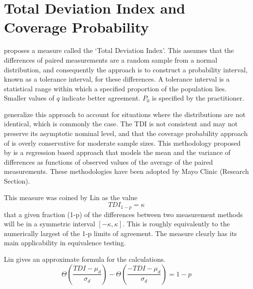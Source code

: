 \documentclass[12pt, a4paper]{report}
\theoremstyle{plain}
\theoremstyle{definition}
\theoremstyle{remark}
\begin{document}
	\section{Total Deviation Index and Coverage Probability}
	
	
	\citet{lin2002} proposes a measure called the `Total Deviation Index'. 
	This assumes that the differences of paired measurements are a random sample from a normal distribution, 
	and consequently the approach is to construct a probability interval, known as a tolerance interval, 
	for these differences. A tolerance interval is a statistical range within which a specified proportion 
	of the population lies.
	Smaller values of $q$ indicate better agreement. $P_{0}$ is specified by the practitioner.
	
	\citet{pkcng} generalize this approach to account for situations where the distributions are not identical, which is commonly the case.
	The TDI is not consistent and may not preserve its asymptotic nominal level, and that the coverage probability approach of \citet{lin2002} is overly conservative for moderate sample sizes.
	This methodology proposed by \citet{pkcng} is a regression based approach that models the mean and the variance of differences as functions of observed values of the average of the paired measurements.
	These methodologies have been adopted by Mayo Clinic (Research Section).
	
	
	This measure was coined by Lin as the value \[TDI_{1-p} = \kappa\] that a given fraction (1-p) of the differences between two measurement methods will be in a symmetric interval $[-\kappa,\kappa]$.
	This is roughly equivalently to the numerically largest of the 1-p limits of agreement.
	The measure clearly has its main applicability in equivalence testing. 
	
	Lin gives an approximate formula for the calculations.
	\[\Theta \left( \frac{ TDI - \mu_d}{\sigma_d} \right) - \Theta \left(  \frac{ -TDI - \mu_d}{\sigma_d} \right) = 1-p\]
	
\end{document}
